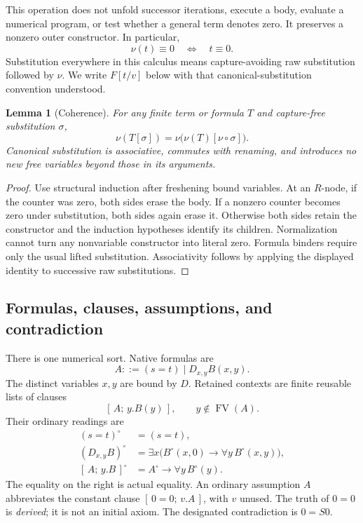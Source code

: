 \documentclass[11pt]{article}
\newtheorem{lemma}[theorem]{Lemma}
\theoremstyle{definition}\newtheorem{definition}[theorem]{Definition}
\newcommand{\N}{\nu}
\newcommand{\lit}{\equiv}
\newcommand{\FV}{\operatorname{FV}}
\newcommand{\cl}[2]{[\,#1;\,#2\,]}
\begin{document}
This operation does not unfold successor iterations, execute a body,
evaluate a numerical program, or test whether a general term denotes
zero. It preserves a nonzero outer constructor. In particular,
\[
 \N(t)\lit0\quad\Longleftrightarrow\quad t\lit0.
\]
Substitution everywhere in this calculus means capture-avoiding raw
substitution followed by $\N$. We write $F[t/v]$ below with that
canonical-substitution convention understood.

\begin{lemma}[Coherence]
For any finite term or formula $T$ and capture-free substitution $\sigma$,
\[
 \N(T[\sigma])=\N\bigl(\N(T)[\N\circ\sigma]\bigr).
\]
Canonical substitution is associative, commutes with renaming, and
introduces no new free variables beyond those in its arguments.
\end{lemma}
\begin{proof}
Use structural induction after freshening bound variables. At an
$R$-node, if the counter was zero, both sides erase the body. If a
nonzero counter becomes zero under substitution, both sides again erase
it. Otherwise both sides retain the constructor and the induction
hypotheses identify its children. Normalization cannot turn any
nonvariable constructor into literal zero. Formula binders require only
the usual lifted substitution. Associativity follows by applying the
displayed identity to successive raw substitutions.
\end{proof}

\subsection{Formulas, clauses, assumptions, and contradiction}

There is one numerical sort. Native formulas are
\[
 A ::= (s=t)\mid D_{x,y}B(x,y).
\]
The distinct variables $x,y$ are bound by $D$. Retained contexts are
finite reusable lists of clauses
\[
 \cl{A}{y.B(y)},\qquad y\notin\FV(A).
\]
Their ordinary readings are
\begin{align*}
 (s=t)^\circ&=(s=t),\\
 (D_{x,y}B)^\circ&=
 \exists x\bigl(B^\circ(x,0)\to\forall y\,B^\circ(x,y)\bigr),\\
 \cl{A}{y.B}^\circ&=A^\circ\to\forall y\,B^\circ(y).
\end{align*}
The equality on the right is actual equality. An ordinary assumption
$A$ abbreviates the constant clause $\cl{0=0}{v.A}$, with $v$ unused.
The truth of $0=0$ is \emph{derived}; it is not an initial axiom.
The designated contradiction is $0=S0$.
\end{document}
